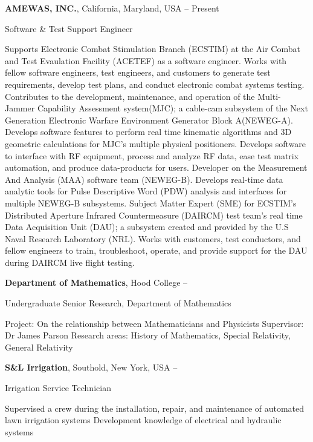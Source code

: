 \documentclass[a4paper,10pt,oneside]{article}
\begin{document}
\begin{body}
{\textbf{AMEWAS, INC.}},
California, Maryland, USA
\hfill
{} --
Present
\par
Software \& Test Support Engineer
\begin{detail}
\BulletItem
Supports Electronic Combat Stimulation Branch (ECSTIM) at the Air Combat and Test Evaulation Facility (ACETEF) as a software engineer.
\BulletItem
Works with fellow software engineers, test engineers, and customers to generate test requirements, develop test plans, and conduct electronic combat systems testing.
\BulletItem
Contributes to the development, maintenance, and operation of the Multi-Jammer Capability Assessment system(MJC); a cable-cam subsystem of the Next Generation Electronic Warfare Environment Generator Block A(NEWEG-A).
\BulletItem
Develops software features to perform real time kinematic algorithms and 3D geometric calculations for MJC's multiple physical positioners.
\BulletItem
Develops software to interface with RF equipment, process and analyze RF data, ease test matrix automation, and produce data-products for users. 
\BulletItem
Developer on the Measurement And Analysis (MAA) software team (NEWEG-B). Develops real-time data analytic tools for Pulse Descriptive Word (PDW) analysis and interfaces for multiple NEWEG-B subsystems.
\BulletItem
Subject Matter Expert (SME) for ECSTIM's Distributed Aperture Infrared Countermeasure (DAIRCM) test team's real time Data Acquisition Unit (DAU); a subsystem created and provided by the U.S Naval Research Laboratory (NRL).
\BulletItem
Works with customers, test conductors, and fellow engineers to train, troubleshoot, operate, and provide support for the DAU during DAIRCM live flight testing.
\end{detail}

{\textbf{Department of Mathematics}},
Hood College
\hfill
{} --
\par
Undergraduate Senior Research, Department of Mathematics
\begin{detail}
\BulletItem
Project:
On the relationship between Mathematicians and Physicists
\BulletItem
Supervisor:
Dr James Parson
\BulletItem
Research areas:
History of Mathematics, Special Relativity, General Relativity
\end{detail}

{\textbf{S\&L Irrigation}},
Southold, New York, USA
\hfill
{} --
\par
Irrigation Service Technician
\begin{detail}
\BulletItem
Supervised a crew during the installation, repair, and maintenance of automated lawn irrigation systems
\BulletItem
Development knowledge of electrical and hydraulic systems
\end{detail}



\end{body}
\end{document}
